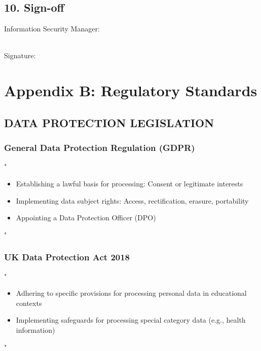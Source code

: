 \documentclass[14pt,a4paper]{article}
\begin{document}
\vspace{12em}

\subsection*{10. Sign-off}

Information Security Manager:

\vspace{2cm}
\noindent\makebox[8cm]{\hrulefill}
\vspace{0.2cm}
\\\noindent Signature:


\newpage

\section{Appendix B: Regulatory Standards}\label{appendix:b}

\subsection*{DATA PROTECTION LEGISLATION}

\subsubsection*{General Data Protection Regulation (GDPR)}
"
\begin{itemize}
    \item Establishing a lawful basis for processing: Consent or legitimate interests
    \item Implementing data subject rights: Access, rectification, erasure, portability
    \item Appointing a Data Protection Officer (DPO)
\end{itemize}
"

\textit{\parencite{EU2016}}

\subsubsection*{UK Data Protection Act 2018}
"
\begin{itemize}
    \item Adhering to specific provisions for processing personal data in educational contexts
    \item Implementing safeguards for processing special category data (e.g., health information)
\end{itemize}
"
\end{document}
